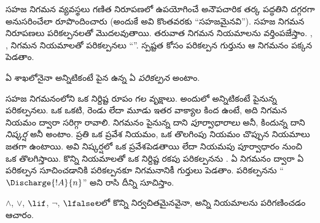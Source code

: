 \documentclass[../../../include/open-logic-section]{subfiles}
\begin{document}
      {}
      {}


\begin{explain}
సహజ నిగమన వ్యవస్థలు గణిత నిరూపణలో ఉపయోగించే అనౌపచారిక తర్క
పద్ధతిని దగ్గరగా అనుసరించేలా రూపొందించారు (అందుకే అవి కొంతవరకు
“సహజమైనవి”). సహజ నిగమన నిరూపణలు పరికల్పనలతో మొదలవుతాయి. తరువాత
నిగమన నియమాలను వర్తింపజేస్తాం. \Intro{\lnot}, \Intro{\lif},
 నిగమన
నియమాలతో పరికల్పనలు “”. స్పష్టత కోసం
 పరికల్పన గుర్తును ఆ నిగమనం పక్కన పెడతాం.
\end{explain}

\begin{defn}[పరికల్పన]
ఏ శాఖలోనైనా అన్నిటికంటే పైన ఉన్న ఏ 
\emph{పరికల్పన} అంటాం.
\end{defn}

సహజ నిగమనంలోని  ఒక నిర్దిష్ట రూపం గల  వృక్షాలు.
అందులో అన్నిటికంటే పైనున్న  పరికల్పనలు. ఒక 
ఒకటి, రెండు లేదా మూడు ఇతర వాక్యాల కింద ఉంటే, అది నిగమన నియమం
ద్వారా సరిగ్గా రావాలి. నిగమనం పైనున్న  దాని
\emph{పూర్వాధారాలు} అనీ, కిందున్న  దాని
\emph{నిష్కర్ష} అనీ అంటాం. ప్రతి  ఒక ప్రవేశ నియమం,
ఒక తొలగింపు నియమం చొప్పున నియమాలు జతగా ఉంటాయి. అవి నిష్కర్షలో
ఒక  ప్రవేశపెడతాయి లేదా నియమపు పూర్వాధారం నుంచి ఒక
 తొలగిస్తాయి. కొన్ని నియమాలతో ఒక నిర్దిష్ట రకపు
పరికల్పనను \emph{}. ఏ నిగమనం ద్వారా ఏ పరికల్పన
 సూచించడానికి పరికల్పనకూ నిగమనానికీ గుర్తులు
పెడతాం. పరికల్పనను ``$\Discharge{!A}{n}$'' అని రాసి దీన్ని సూచిస్తాం.


%
	{$\land$, $\lor$, $\lif$, $\lnot$, $\lfalse$లలో కొన్ని నిర్వచితమైనవైనా, అన్ని  నియమాలను పరిగణించడం ఆచారం.}
\end{document}

